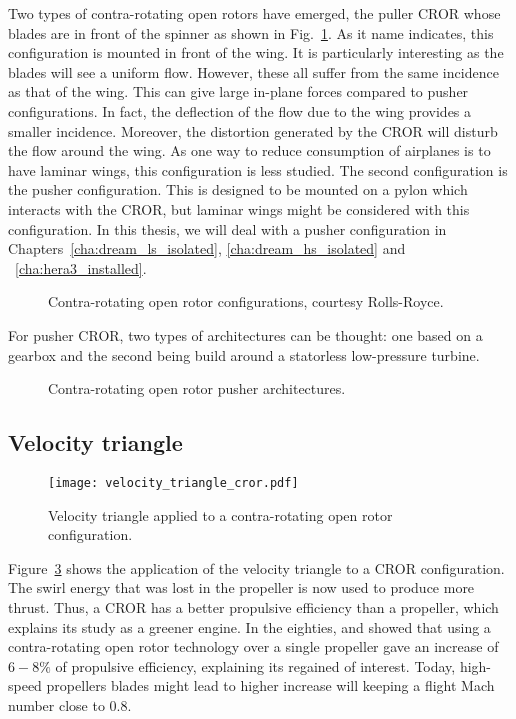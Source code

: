 Two types of contra-rotating open rotors have emerged, the
puller CROR whose blades are in front of the spinner as 
shown in Fig.~\ref{fig:cror_configurations}. As it
name indicates, this configuration is mounted in front of the
wing. It is particularly interesting as the blades will see
a uniform flow. However, these all suffer from the same incidence as that
of the wing. This can give large in-plane forces compared to pusher
configurations. In fact, the deflection of the flow due to the wing provides
a smaller incidence.
Moreover, the distortion generated
by the CROR will disturb the flow around the wing. As one way to reduce
consumption of airplanes is to have laminar wings, this configuration
is less studied. The second configuration is the pusher
configuration. This is designed to be mounted on a pylon which
interacts with the CROR, but laminar wings might be considered with
this configuration. In this thesis, we will deal with a pusher configuration
in Chapters~\ref{cha:dream_ls_isolated}, 
\ref{cha:dream_hs_isolated} and ~\ref{cha:hera3_installed}.
\begin{figure}
  \centering
  \caption{Contra-rotating open rotor configurations, courtesy Rolls-Royce.}
  \label{fig:cror_configurations}
\end{figure}

For pusher CROR, two types of architectures can be thought:
one based on a gearbox and the second
being build around a statorless low-pressure turbine.
\begin{figure}
  \centering
  \caption{Contra-rotating open rotor pusher architectures.}
  \label{fig:cror_architectures}
\end{figure}

\subsection{Velocity triangle}
\label{sub:cror_velocity_triangle}
\begin{figure}
  \centering
  \texttt{[image: velocity\_triangle\_cror.pdf]}
  \caption{Velocity triangle applied to a contra-rotating open rotor configuration.}
  \label{fig:velocity_triangle_cror}
\end{figure}
Figure~\ref{fig:velocity_triangle_cror} shows the application
of the velocity triangle to a CROR configuration. The swirl
energy that was lost in the propeller is now used to 
produce more thrust. Thus, a CROR has a better propulsive
efficiency than a propeller, which explains its study as
a greener engine. In the eighties, 
\citet{Strack1981} and \citet{Hager1988} showed that
using a contra-rotating open rotor technology over
a single propeller gave an increase of $6-8\%$
of propulsive efficiency, explaining its regained of interest.
Today, high-speed propellers blades might lead to higher increase
will keeping a flight Mach number close to $0.8$.

